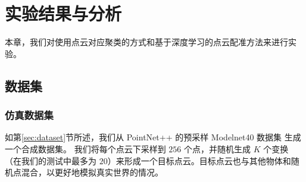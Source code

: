 \chapter{实验结果与分析}
本章，我们对使用点云对应聚类的方式和基于深度学习的点云配准方法来进行实验。
\section{数据集}
\subsection{仿真数据集}
如第\ref{sec:dataset}节所述，我们从 PointNet++ \cite{qi2017pointnet++} 的预采样 Modelnet40 数据集\cite{sunmodelnet40} 生成一个合成数据集。
我们将每个点云下采样到 $256$ 个点，并随机生成 $K$ 个变换（在我们的测试中最多为 $20$）来形成一个目标点云。目标点云也与其他物体和随机点混合，以更好地模拟真实世界的情况。

